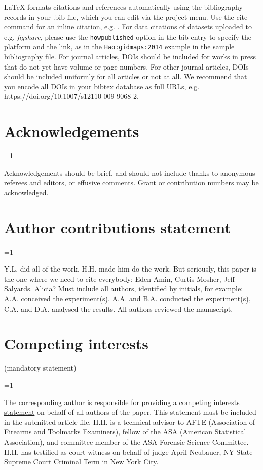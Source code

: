 \documentclass[fleqn,10pt]{wlscirep}
\newcommand{\ifinstruction}{1} %
\begin{document}


\noindent LaTeX formats citations and references automatically using the bibliography records in your .bib file, which you can edit via the project menu. Use the cite command for an inline citation, e.g. \cite{Kaufman2020, Figueredo:2009dg, Babichev2002, behringer2014manipulating}. For data citations of datasets uploaded to e.g. \emph{figshare}, please use the \verb|howpublished| option in the bib entry to specify the platform and the link, as in the \verb|Hao:gidmaps:2014| example in the sample bibliography file. For journal articles, DOIs should be included for works in press that do not yet have volume or page numbers. For other journal articles, DOIs should be included uniformly for all articles or not at all. We recommend that you encode all DOIs in your bibtex database as full URLs, e.g. https://doi.org/10.1007/s12110-009-9068-2.

\section*{Acknowledgements} 
\ifnum \ifinstruction=1

Acknowledgements should be brief, and should not include thanks to
anonymous referees and editors, or effusive comments. Grant or
contribution numbers may be acknowledged. \fi

\section*{Author contributions statement}

\ifnum \ifinstruction=1

Y.L. did all of the work, H.H. made him do the work. But seriously, this
paper is the one where we need to cite everybody: Eden Amin, Curtis
Mosher, Jeff Salyards. Alicia? \fi
Must include all authors, identified by initials, for example:
A.A. conceived the experiment(s), A.A. and B.A. conducted the experiment(s), C.A. and D.A. analysed the results. All authors reviewed the manuscript. 

\section*{Competing interests} (mandatory statement)

\ifnum \ifinstruction=1

The corresponding author is responsible for providing a
\href{https://www.nature.com/sdata/policies/editorial-and-publishing-policies#competing}{competing interests statement}
on behalf of all authors of the paper. This statement must be included
in the submitted article file. H.H. is a technical advisor to AFTE
(Association of Firearms and Toolmarks Examiners), fellow of the ASA
(American Statistical Association), and committee member of the ASA
Forensic Science Committee. H.H. has testified as court witness on
behalf of judge April Neubauer, NY State Supreme Court Criminal Term in
New York City. \fi
\end{document}
